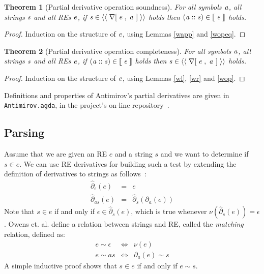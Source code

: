 \documentclass[fleqn,10pt]{SelfArx} %
\newtheorem{Theorem}{Theorem}
\theoremstyle{definition}
\newcommand{\D}[1]{\blue{\mathsf{#1}}}
\newcommand{\C}[1]{\red{\mathsf{#1}}}
\newcommand{\F}[1]{\green{\mathsf{#1}}}
\newcommand{\V}[1]{\purple{\mathit{#1}}}
\begin{document}
\begin{Theorem}[Partial derivative operation soundness]
For all symbols \ensuremath{\V{a}}, all strings \ensuremath{\V{s}} and all REs \ensuremath{\V{e}}, if \ensuremath{\V{s}\;\D{\in\langle\langle}\;\F{\nabla[}\;\V{e}\;\red{,}\,\;\V{a}\;\mskip1.5mu]\;\D{\rangle\rangle}} holds then \ensuremath{(\V{a}\;\C{::}\;\V{s})\;\D{\in\llbracket}\;\V{e}\;\D{\rrbracket}} holds.
\end{Theorem}
\begin{proof}
  Induction on the structure of \ensuremath{\V{e}}, using Lemmas \ref{wapp} and \ref{wopeq}.
\end{proof}

\begin{Theorem}[Partial derivative operation completeness]
For all symbols \ensuremath{\V{a}}, all strings \ensuremath{\V{s}} and all REs \ensuremath{\V{e}}, if \ensuremath{(\V{a}\;\C{::}\;\V{s})\;\D{\in\llbracket}\;\V{e}\;\D{\rrbracket}} holds then \ensuremath{\V{s}\;\D{\in\langle\langle}\;\F{\nabla[}\;\V{e}\;\red{,}\,\;\V{a}\;\mskip1.5mu]\;\D{\rangle\rangle}} holds.
\end{Theorem}
\begin{proof}
  Induction on the structure  of \ensuremath{\V{e}}, using Lemmas \ref{wl}, \ref{wr} and \ref{wop}.
\end{proof}

Definitions and properties of Antimirov's partial derivatives are given in
\texttt{Antimirov.agda}, in the project's on-line
repository~\cite{regex-rep}.

\subsection{Parsing}

Assume that we are given an RE $e$ and a string $s$ and we want to 
determine if $s \in e$. We can use RE derivatives for building such a 
test by extending the definition of derivatives to strings as follows~\cite{Owens2009}:
\[
    \begin{array}{lcl}
        \widehat{\partial}_\epsilon(e) & = & e\\
        \widehat{\partial}_{as}(e)     & = & \widehat{\partial}_s(\partial_a(e))
    \end{array}
\]
Note that $s \in e$ if and only if $\epsilon \in \widehat{\partial}_s(e)$, which is true whenever 
$\nu(\widehat{\partial}_s(e)) = \epsilon$. Owens et. al. define a relation between strings and RE, called
the \emph{matching} relation, defined as:
\[
    \begin{array}{lcl}
        e \sim \epsilon & \Leftrightarrow & \nu(e) \\
        e \sim as       & \Leftrightarrow & \partial_a(e) \sim s
    \end{array}
\] 
A simple inductive proof shows that $s \in e$ if and only if $e \sim s$. 
\end{document}
